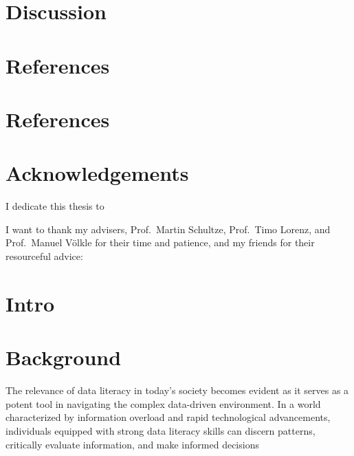 \documentclass[
  12pt,
  a4paper,
  twoside]{article}
\begin{document}
\hypertarget{discussion-1}{%
\section{Discussion}\label{discussion-1}}

\hypertarget{references}{%
\section*{References}\label{references}}

\hypertarget{references-1}{%
\section*{References}\label{references-1}}

\hypertarget{acknowledgements-2}{%
\section*{Acknowledgements}\label{acknowledgements-2}}

I dedicate this thesis to

I want to thank my advisers, Prof.~Martin Schultze, Prof.~Timo Lorenz, and Prof.~Manuel Völkle for their time and patience, and my friends for their resourceful advice:

\newpage\null\thispagestyle{empty}\newpage

\hypertarget{intro-1}{%
\section{Intro}\label{intro-1}}

\hypertarget{background-2}{%
\section{Background}\label{background-2}}

The relevance of data literacy in today's society becomes evident as it serves as a potent tool in navigating the complex data-driven environment. In a world characterized by information overload and rapid technological advancements, individuals equipped with strong data literacy skills can discern patterns, critically evaluate information, and make informed decisions
\end{document}
